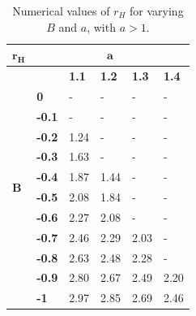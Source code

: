 \documentclass[12pt,a4paper,oneside]{book}
\begin{document}
\begin{table}
    \centering
 \begin{tabular}{|p{0.15in}|p{0.3in}|p{0.3in}|p{0.3in}|p{0.3in}|p{0.3in}|} \hline
${\boldsymbol{r}}_{\boldsymbol{H}}$\textbf{} & \multicolumn{5}{|c|}{$\boldsymbol{a}$\textbf{}} \\ \hline
\multirow{12}{4em}{$\boldsymbol{B}$}& & \textbf{1.1} & \textbf{1.2} & \textbf{1.3} & \textbf{1.4}  \\ \cline{2-6}
 & \textbf{0} & - & - & - & - \\  \cline{2-6}
 & \textbf{-0.1} & - & - & - & - \\  \cline{2-6}
 & \textbf{-0.2} & 1.24 & - & - & - \\  \cline{2-6}
 & \textbf{-0.3} & 1.63 & - & - & - \\  \cline{2-6}
 & \textbf{-0.4} & 1.87 & 1.44 & - & - \\   \cline{2-6}
 & \textbf{-0.5} & 2.08 & 1.84 & - & - \\  \cline{2-6}
 & \textbf{-0.6} & 2.27 & 2.08 & - & - \\  \cline{2-6}
 & \textbf{-0.7} & 2.46 & 2.29 & 2.03 & - \\  \cline{2-6}
 & \textbf{-0.8} & 2.63 & 2.48 & 2.28 & - \\  \cline{2-6}
 & \textbf{-0.9} & 2.80 & 2.67 & 2.49 & 2.20 \\  \cline{2-6}
 & \textbf{-1} & 2.97 & 2.85 & 2.69 & 2.46 \\
\hline
\end{tabular}
    \caption{Numerical values of $r_H$ for varying $B$ and $a$, with $a>1$.}
    \label{Table2}
\end{table}
\end{document}
